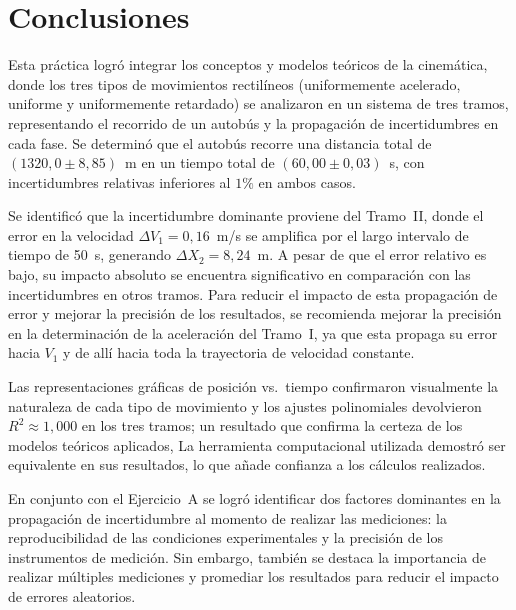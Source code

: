 \chapter{Conclusiones}
\thispagestyle{fancy}
\label{ch:conclusiones}

Esta práctica logró integrar los conceptos y modelos teóricos de la cinemática,
donde los tres tipos de movimientos rectilíneos (uniformemente acelerado, 
uniforme y uniformemente retardado) se analizaron en un sistema de tres tramos, 
representando el recorrido de un autobús y la propagación de incertidumbres en cada fase.
Se determinó que el autobús recorre una distancia total de $(1320{,}0 \pm 8{,}85)$~m en un tiempo total de
$(60{,}00 \pm 0{,}03)$~s, con incertidumbres relativas inferiores al $1\%$ en
ambos casos.

Se identificó que la incertidumbre dominante proviene del Tramo~II, donde el
error en la velocidad $\Delta V_1 = 0{,}16$~m/s se amplifica por el largo
intervalo de tiempo de 50~s, generando $\Delta X_2 = 8{,}24$~m. A pesar de que 
el error relativo es bajo, su impacto absoluto se encuentra significativo
en comparación con las incertidumbres en otros tramos. Para reducir 
el impacto de esta propagación de error y mejorar la precisión de los resultados, se
recomienda mejorar la precisión en la determinación de 
la aceleración del Tramo~I, ya que esta propaga su error hacia $V_1$ y 
de allí hacia toda la trayectoria de velocidad constante. 

Las representaciones gráficas de posición vs.\ tiempo confirmaron visualmente
la naturaleza de cada tipo de movimiento y los ajustes polinomiales devolvieron
$R^2 \approx 1{,}000$ en los tres tramos; un resultado que confirma la certeza 
de los modelos teóricos aplicados, La herramienta computacional
utilizada demostró ser equivalente en sus resultados, lo que añade confianza a
los cálculos realizados.

En conjunto con el Ejercicio~A se logró identificar dos factores dominantes
 en la propagación de incertidumbre
al momento de realizar las mediciones: la reproducibilidad de las condiciones 
experimentales y la precisión de los instrumentos de medición. Sin embargo, 
también se destaca la importancia de realizar múltiples mediciones y 
promediar los resultados para reducir el impacto de errores aleatorios.